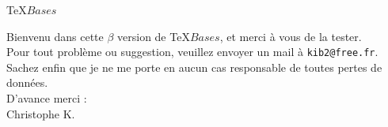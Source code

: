 \documentclass[12pt,a4paper]{article}
\begin{document}
\begin{center}
\begin{Huge}\TeX $Bases$\end{Huge}
\end{center}
\par
Bienvenu dans cette $\beta$ version de \TeX $Bases$, et merci à vous de la tester.\\

Pour tout problème ou suggestion, veuillez envoyer un mail à \texttt{kib2@free.fr}.
Sachez enfin que je ne me porte en aucun cas responsable de toutes pertes de données.\\

D'avance merci :\\

Christophe K.
\end{document}
